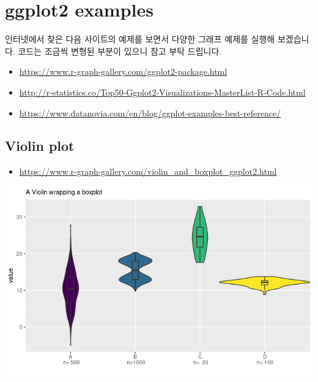 \documentclass[
]{book}
\providecommand{\tightlist}{%
  \setlength{\itemsep}{0pt}\setlength{\parskip}{0pt}}
\begin{document}
\hypertarget{ggplot2-examples}{%
\chapter{ggplot2 examples}\label{ggplot2-examples}}

인터넷에서 찾은 다음 사이트의 예제를 보면서 다양한 그래프 예제를 실행해 보겠습니다. 코드는 조금씩 변형된 부분이 있으니 참고 부탁 드립니다.

\begin{itemize}
\tightlist
\item
  \url{https://www.r-graph-gallery.com/ggplot2-package.html}
\item
  \url{http://r-statistics.co/Top50-Ggplot2-Visualizations-MasterList-R-Code.html}
\item
  \url{https://www.datanovia.com/en/blog/ggplot-examples-best-reference/}
\end{itemize}

\hypertarget{violin-plot}{%
\section{Violin plot}\label{violin-plot}}

\begin{itemize}
\tightlist
\item
  \url{https://www.r-graph-gallery.com/violin_and_boxplot_ggplot2.html}
\end{itemize}

\includegraphics{images/10/000013.png}
\end{document}
